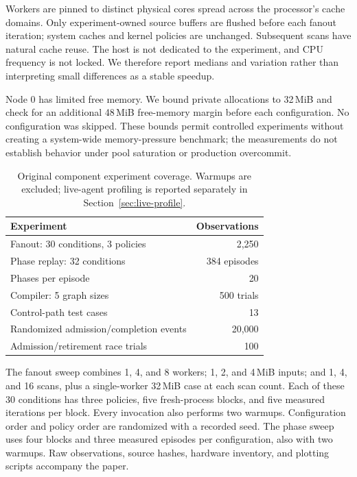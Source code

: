 \documentclass[letterpaper,twocolumn,10pt]{article}
\begin{document}
Workers are pinned to distinct physical cores spread across the processor's
cache domains. Only experiment-owned source buffers are flushed before each
fanout iteration; system caches and kernel policies are unchanged. Subsequent
scans have natural cache reuse. The host is not dedicated to the experiment,
and CPU frequency is not locked. We therefore report medians and variation
rather than interpreting small differences as a stable speedup.

Node 0 has limited free memory. We bound private allocations to 32\,MiB and
check for an additional 48\,MiB free-memory margin before each configuration.
No configuration was skipped. These bounds permit controlled experiments
without creating a system-wide memory-pressure benchmark; the measurements
do not establish behavior under pool saturation or production overcommit.

\begin{table}[t]
\centering
\caption{Original component experiment coverage. Warmups are excluded;
live-agent profiling is reported separately in Section~\ref{sec:live-profile}.}
\label{tab:coverage}
\begin{tabular}{p{}r}
\toprule
Experiment & Observations \\
\midrule
Fanout: 30 conditions, 3 policies & 2,250 \\
Phase replay: 32 conditions & 384 episodes \\
Phases per episode & 20 \\
Compiler: 5 graph sizes & 500 trials \\
Control-path test cases & 13 \\
Randomized admission/completion events & 20,000 \\
Admission/retirement race trials & 100 \\
\bottomrule
\end{tabular}
\end{table}

The fanout sweep combines 1, 4, and 8 workers; 1, 2, and 4\,MiB inputs; and
1, 4, and 16 scans, plus a single-worker 32\,MiB case at each scan count.
Each of these 30 conditions has three policies, five fresh-process blocks,
and five measured iterations per block. Every invocation also performs two
warmups. Configuration order and policy order are randomized with a recorded
seed. The phase sweep uses four blocks and three measured episodes per
configuration, also with two warmups. Raw observations, source hashes,
hardware inventory, and plotting scripts accompany the paper.
\end{document}
